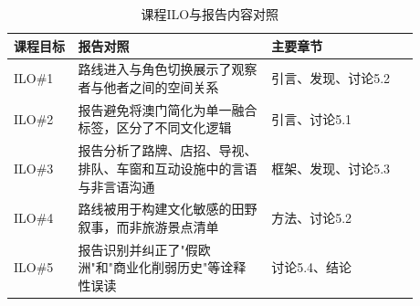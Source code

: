 \documentclass[12pt,a4paper]{article}
\begin{document}
\begin{table}[H]
\small
\centering
\caption{课程ILO与报告内容对照}
\begin{tabular}{>{\raggedright\arraybackslash}p{0.14\linewidth}>{\raggedright\arraybackslash}p{0.42\linewidth}>{\raggedright\arraybackslash}p{0.32\linewidth}}
\toprule
课程目标 & 报告对照 & 主要章节 \\
\midrule
ILO\#1 & 路线进入与角色切换展示了观察者与他者之间的空间关系 & 引言、发现、讨论5.2 \\
ILO\#2 & 报告避免将澳门简化为单一融合标签，区分了不同文化逻辑 & 引言、讨论5.1 \\
ILO\#3 & 报告分析了路牌、店招、导视、排队、车窗和互动设施中的言语与非言语沟通 & 框架、发现、讨论5.3 \\
ILO\#4 & 路线被用于构建文化敏感的田野叙事，而非旅游景点清单 & 方法、讨论5.2 \\
ILO\#5 & 报告识别并纠正了"假欧洲"和"商业化削弱历史"等诠释性误读 & 讨论5.4、结论 \\
\bottomrule
\end{tabular}
\end{table}
\end{document}
